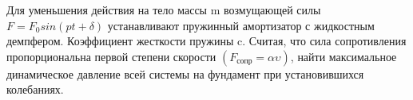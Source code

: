 Для уменьшения действия на тело массы m 
возмущающей силы 
$F=F_0 sin(pt+\delta)$ устанавливают 
пружинный амортизатор с жидкостным 
демпфером. 
Коэффициент жесткости пружины c.
Считая, что сила сопротивления 
пропорциональна первой степени скорости 
$(F_{сопр}=\alpha\upsilon)$, найти максимальное 
динамическое давление всей системы на 
фундамент при установившихся колебаниях.
